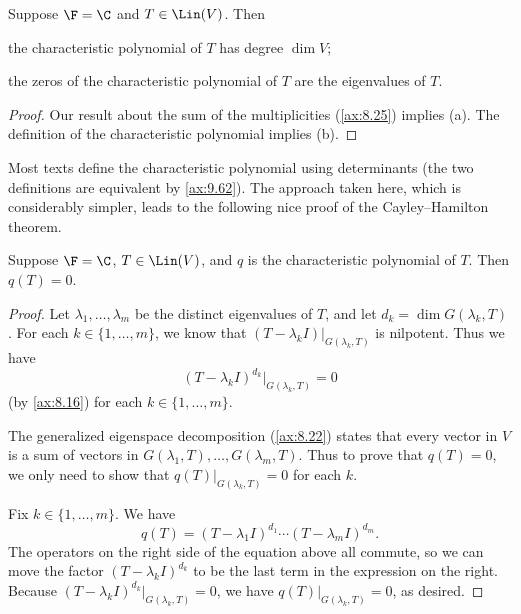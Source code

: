 \begin{result}\label{ax:8.28}
Suppose $\F=\C$ and $T\in\Lin(V)$. Then
\begin{parts}
\item the characteristic polynomial of $T$ has degree $\dim V$;
\item the zeros of the characteristic polynomial of $T$ are the eigenvalues of
  $T$.
\end{parts}
\end{result}

\begin{proof}
Our result about the sum of the multiplicities (\ref{ax:8.25}) implies (a). The
definition of the characteristic polynomial implies (b).
\end{proof}

Most texts define the characteristic polynomial using determinants (the two
definitions are equivalent by \ref{ax:9.62}). The approach taken here, which is
considerably simpler, leads to the following nice proof of the Cayley--Hamilton
theorem.

\begin{result}\label{ax:8.29}
Suppose $\F=\C$, $T\in\Lin(V)$, and $q$ is the characteristic polynomial of
$T$. Then $q(T)=0$.
\end{result}

\begin{proof}
Let $\lambda_1,\dots,\lambda_m$ be the distinct eigenvalues of $T$, and let
$d_k=\dim G(\lambda_k,T)$. For each $k\in\{1,\dots,m\}$, we know that
$(T-\lambda_kI)|_{G(\lambda_k,T)}$ is nilpotent. Thus we have
\[ (T-\lambda_kI)^{d_k}|_{G(\lambda_k,T)} = 0 \]
(by \ref{ax:8.16}) for each $k\in\{1,\dots,m\}$.

%
The generalized eigenspace decomposition (\ref{ax:8.22}) states that every
vector in $V$ is a sum of vectors in $G(\lambda_1,T),\dots,G(\lambda_m,T)$.
Thus to prove that $q(T)=0$, we only need to show that
$q(T)|_{G(\lambda_k,T)}=0$ for each $k$.

Fix $k\in\{1,\dots,m\}$. We have
\[ q(T) = (T-\lambda_1I)^{d_1}\cdots(T-\lambda_mI)^{d_m}. \]
The operators on the right side of the equation above all commute, so we can
move the factor $(T-\lambda_kI)^{d_k}$ to be the last term in the expression on
the right. Because $(T-\lambda_kI)^{d_k}|_{G(\lambda_k,T)}=0$, we have
$q(T)|_{G(\lambda_k,T)}=0$, as desired.
\end{proof}

